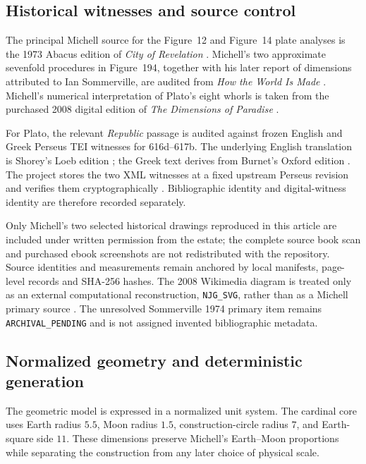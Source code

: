 \documentclass[11pt]{article}
\newcommand{\ArchivePending}{\texttt{ARCHIVAL\_PENDING}}
\begin{document}
\subsection{Historical witnesses and source control}

The principal Michell source for the Figure~12 and Figure~14 plate analyses is
the 1973 Abacus edition of \emph{City of Revelation}
\citep{michell1973city}.  Michell's two approximate sevenfold procedures in
Figure~194, together with his later report of dimensions attributed to Ian
Sommerville, are audited from \emph{How the World Is Made}
\citep{michell2009world}.  Michell's numerical interpretation of Plato's eight
whorls is taken from the purchased 2008 digital edition of
\emph{The Dimensions of Paradise} \citep{michell2008dimensions}.

For Plato, the relevant \emph{Republic} passage is audited against frozen
English and Greek Perseus TEI witnesses for 616d--617b.  The underlying
English translation is Shorey's Loeb edition \citep{plato1935republic}; the
Greek text derives from Burnet's Oxford edition
\citep{plato1902republic}.  The project stores the two XML witnesses at a
fixed upstream Perseus revision and verifies them cryptographically
\citep{perseusRepublicWitnesses}.  Bibliographic identity and digital-witness
identity are therefore recorded separately.

Only Michell's two selected historical drawings reproduced in this article
are included under written permission from the estate; the complete source
book scan and purchased ebook screenshots are not redistributed with the
repository. Source identities and measurements remain anchored by local
manifests, page-level records and SHA-256 hashes.  The 2008 Wikimedia
diagram is treated only as an external computational reconstruction,
\texttt{NJG\_SVG}, rather than as a Michell primary source
\citep{anonmoos2008newjerusalem}.  The unresolved Sommerville 1974 primary
item remains \ArchivePending{} and is not assigned invented bibliographic
metadata.

\subsection{Normalized geometry and deterministic generation}

The geometric model is expressed in a normalized unit system.  The cardinal
core uses Earth radius $5.5$, Moon radius $1.5$, construction-circle radius
$7$, and Earth-square side $11$.  These dimensions preserve Michell's
Earth--Moon proportions while separating the construction from any later
choice of physical scale.
\end{document}
